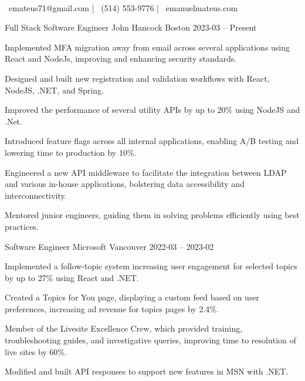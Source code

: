 \documentclass[]{awesome-cv}
\begin{document}
    
\begin{center}
	  \\
	\vspace{2mm}
	{\faEnvelope\ emateus71@gmail.com} | {\faMobile\ (514) 553-9776} | {\faLink\ emanuelmateus.com}
\end{center}
\begin{cventries}
	\cventry
	{Full Stack Software Engineer}
	{John Hancock}
	{Boston}
	{2023-03 – Present}
	{\begin{cvitems}
		\item {Implemented MFA migration away from email across several applications using React and NodeJs, improving and enhancing security standards.}
		\item {Designed and built new registration and validation workflows with React, NodeJS, .NET, and Spring.}
		\item {Improved the performance of several utility APIs by up to 20\% using NodeJS and .Net.}
		\item {Introduced feature flags across all internal applications, enabling A/B testing and lowering time to production by 10\%.}
		\item {Engineered a new API middleware to facilitate the integration between LDAP and various in-house applications, bolstering data accessibility and interconnectivity.}
		\item {Mentored junior engineers, guiding them in solving problems efficiently using best practices.}
		\end{cvitems}}
	\cventry
	{Software Engineer}
	{Microsoft}
	{Vancouver}
	{2022-03 – 2023-02}
	{\begin{cvitems}
		\item {Implemented a follow-topic system increasing user engagement for selected topics by up to 27\% using React and .NET.}
		\item {Created a \textquotesingle{}Topics for You\textquotesingle{} page, displaying a custom feed based on user preferences, increasing ad revenue for topics pages by 2.4\%.}
		\item {Member of the Livesite Excellence Crew, which provided training, troubleshooting guides, and investigative queries, improving time to resolution of live sites by 60\%.}
		\item {Modified and built API responses to support new features in MSN with .NET.}

\end{cvitems}}
\end{cventries}
\end{document}
